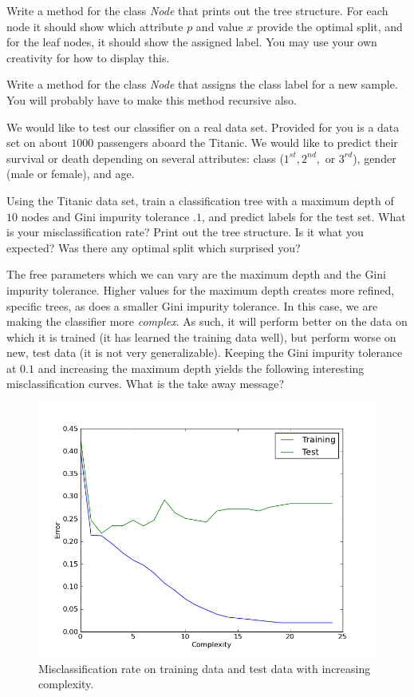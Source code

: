 \begin{problem}
Write a method for the class \emph{Node} that prints out the tree structure. For each node it should show which attribute $p$ and value $x$ provide the optimal split, and for the leaf nodes, it should show the assigned label. You may use your own creativity for how to display this.
\end{problem}

\begin{problem}
Write a method for the class \emph{Node} that assigns the class label for a new sample. You will probably have to make this method recursive also.
\end{problem}

We would like to test our classifier on a real data set. Provided for you is a data set on about $1000$ passengers aboard the Titanic. We would like to predict their survival or death depending on several attributes: class ($1^{st}, 2^{nd},$ or $3^{rd}$), gender (male or female), and age.

\begin{problem}
Using the Titanic data set, train a classification tree with a maximum depth of $10$ nodes and Gini impurity tolerance $.1$, and predict labels for the test set. What is your misclassification rate? Print out the tree structure. Is it what you expected? Was there any optimal split which surprised you?
\end{problem}

The free parameters which we can vary are the maximum depth and the Gini impurity tolerance. Higher values for the maximum depth creates more refined, specific trees, as does a smaller Gini impurity tolerance. In this case, we are making the classifier more \emph{complex}. As such, it will perform better on the data on which it is trained (it has learned the training data well), but perform worse on new, test data (it is not very generalizable). Keeping the Gini impurity tolerance at $0.1$ and increasing the maximum depth yields the following interesting misclassification curves. What is the take away message?

\begin{figure}
\centering
\includegraphics[width=\textwidth]{complexity.png}
\caption{Misclassification rate on training data and test data with increasing complexity.}
\end{figure}
